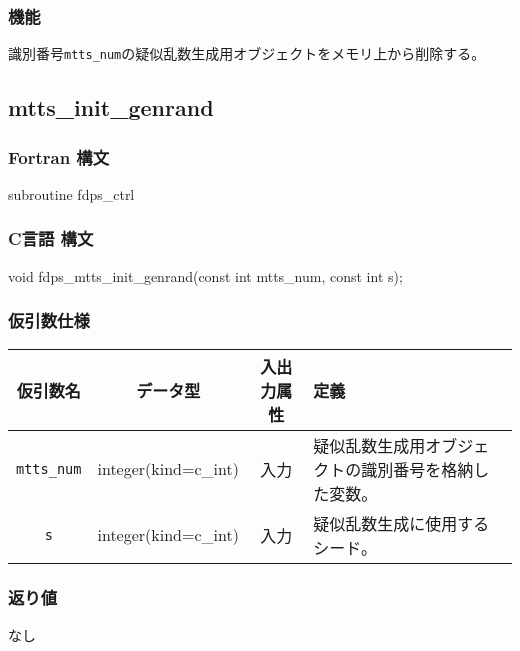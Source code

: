 \subsubsection*{機能}
識別番号\texttt{mtts\_num}の疑似乱数生成用オブジェクトをメモリ上から削除する。
\clearpage

\subsection{mtts\_init\_genrand}
\subsubsection*{Fortran 構文}
\begin{screen}
\begin{spverbatim}  
subroutine fdps_ctrl%
\end{spverbatim}
\end{screen}

\subsubsection*{C言語 構文}
\begin{screen}
\begin{spverbatim}  
void fdps_mtts_init_genrand(const int mtts_num,
                            const int s);
\end{spverbatim}
\end{screen}

\subsubsection*{仮引数仕様}
\begin{table}[h]
\begin{tabularx}{\linewidth}{cccX}
\toprule
\rowcolor{Snow2}
仮引数名 & データ型 & 入出力属性 & 定義 \\
\midrule
\verb|mtts_num| & integer(kind=c\_int) & 入力 & 疑似乱数生成用オブジェクトの識別番号を格納した変数。\\
\verb|s| & integer(kind=c\_int) & 入力 & 疑似乱数生成に使用するシード。\\
\bottomrule
\end{tabularx}
\end{table}

\subsubsection*{返り値}
なし

